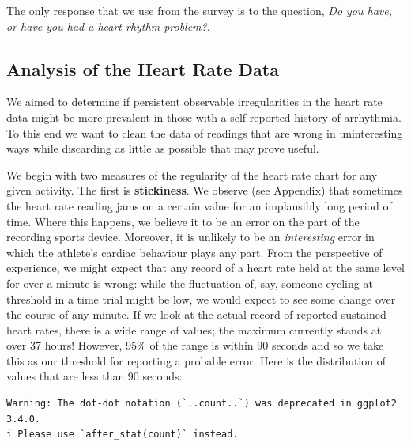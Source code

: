 \documentclass[
  letterpaper,
  DIV=11,
  numbers=noendperiod]{scrartcl}
\begin{document}
The only response that we use from the survey is to the question,
\emph{Do you have, or have you had a heart rhythm problem?}.

\subsection{Analysis of the Heart Rate
Data}\label{analysis-of-the-heart-rate-data}

We aimed to determine if persistent observable irregularities in the
heart rate data might be more prevalent in those with a self reported
history of arrhythmia. To this end we want to clean the data of readings
that are wrong in uninteresting ways while discarding as little as
possible that may prove useful.

We begin with two measures of the regularity of the heart rate chart for
any given activity. The first is \textbf{stickiness}. We observe (see
Appendix) that sometimes the heart rate reading jams on a certain value
for an implausibly long period of time. Where this happens, we believe
it to be an error on the part of the recording sports device. Moreover,
it is unlikely to be an \emph{interesting} error in which the athlete's
cardiac behaviour plays any part. From the perspective of experience, we
might expect that any record of a heart rate held at the same level for
over a minute is wrong: while the fluctuation of, say, someone cycling
at threshold in a time trial might be low, we would expect to see some
change over the course of any minute. If we look at the actual record of
reported sustained heart rates, there is a wide range of values; the
maximum currently stands at over 37 hours! However, 95\% of the range is
within 90 seconds and so we take this as our threshold for reporting a
probable error. Here is the distribution of values that are less than 90
seconds:

\begin{verbatim}
Warning: The dot-dot notation (`..count..`) was deprecated in ggplot2 3.4.0.
i Please use `after_stat(count)` instead.
\end{verbatim}
\end{document}
